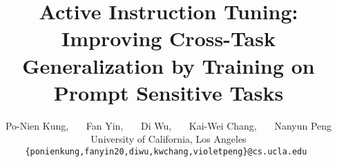 \documentclass[11pt]{article}
\title{
Active Instruction Tuning: Improving Cross-Task Generalization by Training on Prompt Sensitive Tasks
}  %
\author{Po-Nien Kung, ~~~Fan Yin, ~~~Di Wu, ~~~Kai-Wei Chang, ~~~Nanyun Peng\\
   University of California, Los Angeles \\
   {\tt \{ponienkung,fanyin20,diwu,kwchang,violetpeng\}@cs.ucla.edu } \\}
\begin{document}
\maketitle
\begin{abstract}



\end{abstract}
\end{document}
